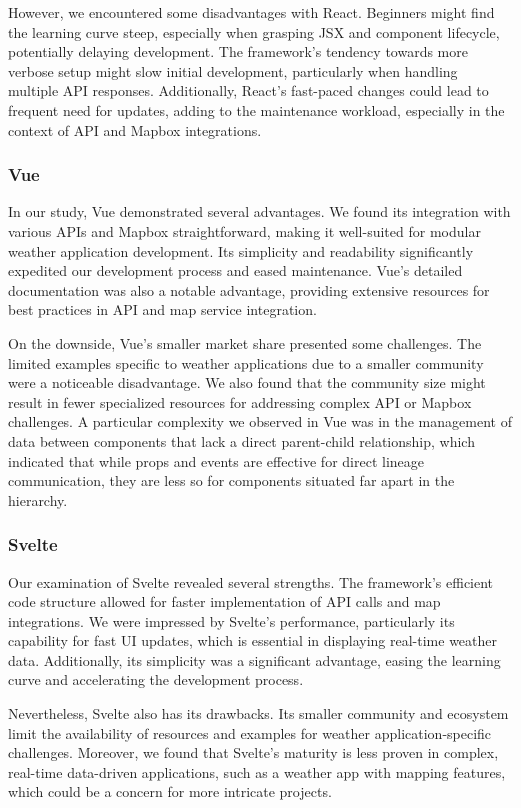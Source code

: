 However, we encountered some disadvantages with React. Beginners might find the learning curve steep, especially when grasping JSX and component lifecycle, potentially delaying development. The framework's tendency towards more verbose setup might slow initial development, particularly when handling multiple API responses. Additionally, React's fast-paced changes could lead to frequent need for updates, adding to the maintenance workload, especially in the context of API and Mapbox integrations.

\subsubsection{Vue}

In our study, Vue demonstrated several advantages. We found its integration with various APIs and Mapbox straightforward, making it well-suited for modular weather application development. Its simplicity and readability significantly expedited our development process and eased maintenance. Vue's detailed documentation was also a notable advantage, providing extensive resources for best practices in API and map service integration.

On the downside, Vue's smaller market share presented some challenges. The limited examples specific to weather applications due to a smaller community were a noticeable disadvantage. We also found that the community size might result in fewer specialized resources for addressing complex API or Mapbox challenges. A particular complexity we observed in Vue was in the management of data between components that lack a direct parent-child relationship, which indicated that while props and events are effective for direct lineage communication, they are less so for components situated far apart in the hierarchy.

\subsubsection{Svelte}

Our examination of Svelte revealed several strengths. The framework's efficient code structure allowed for faster implementation of API calls and map integrations. We were impressed by Svelte's performance, particularly its capability for fast UI updates, which is essential in displaying real-time weather data. Additionally, its simplicity was a significant advantage, easing the learning curve and accelerating the development process.

Nevertheless, Svelte also has its drawbacks. Its smaller community and ecosystem limit the availability of resources and examples for weather application-specific challenges. Moreover, we found that Svelte's maturity is less proven in complex, real-time data-driven applications, such as a weather app with mapping features, which could be a concern for more intricate projects.